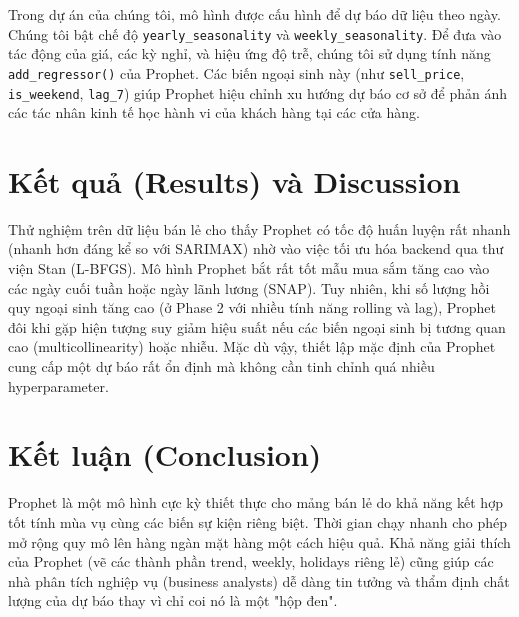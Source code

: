 \documentclass{article}
\begin{document}
Trong dự án của chúng tôi, mô hình được cấu hình để dự báo dữ liệu theo ngày. Chúng tôi bật chế độ \texttt{yearly\_seasonality} và \texttt{weekly\_seasonality}. Để đưa vào tác động của giá, các kỳ nghỉ, và hiệu ứng độ trễ, chúng tôi sử dụng tính năng \texttt{add\_regressor()} của Prophet. Các biến ngoại sinh này (như \texttt{sell\_price}, \texttt{is\_weekend}, \texttt{lag\_7}) giúp Prophet hiệu chỉnh xu hướng dự báo cơ sở để phản ánh các tác nhân kinh tế học hành vi của khách hàng tại các cửa hàng.

\section{Kết quả (Results) và Discussion}
Thử nghiệm trên dữ liệu bán lẻ cho thấy Prophet có tốc độ huấn luyện rất nhanh (nhanh hơn đáng kể so với SARIMAX) nhờ vào việc tối ưu hóa backend qua thư viện Stan (L-BFGS). Mô hình Prophet bắt rất tốt mẫu mua sắm tăng cao vào các ngày cuối tuần hoặc ngày lãnh lương (SNAP). Tuy nhiên, khi số lượng hồi quy ngoại sinh tăng cao (ở Phase 2 với nhiều tính năng rolling và lag), Prophet đôi khi gặp hiện tượng suy giảm hiệu suất nếu các biến ngoại sinh bị tương quan cao (multicollinearity) hoặc nhiễu. Mặc dù vậy, thiết lập mặc định của Prophet cung cấp một dự báo rất ổn định mà không cần tinh chỉnh quá nhiều hyperparameter.

\section{Kết luận (Conclusion)}
Prophet là một mô hình cực kỳ thiết thực cho mảng bán lẻ do khả năng kết hợp tốt tính mùa vụ cùng các biến sự kiện riêng biệt. Thời gian chạy nhanh cho phép mở rộng quy mô lên hàng ngàn mặt hàng một cách hiệu quả. Khả năng giải thích của Prophet (vẽ các thành phần trend, weekly, holidays riêng lẻ) cũng giúp các nhà phân tích nghiệp vụ (business analysts) dễ dàng tin tưởng và thẩm định chất lượng của dự báo thay vì chỉ coi nó là một "hộp đen".
\end{document}
